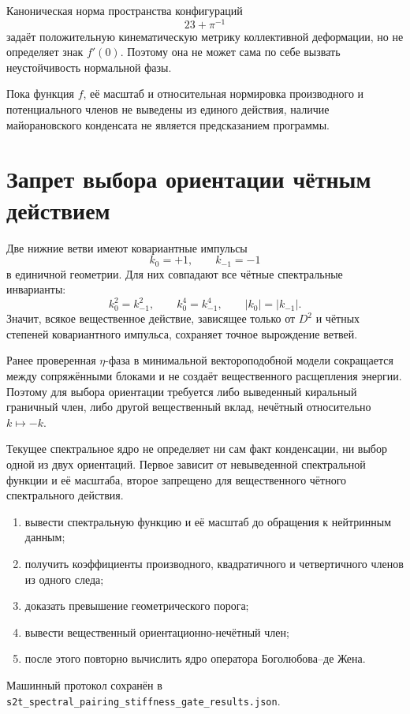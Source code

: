 Каноническая норма пространства конфигураций
\[
 23+\pi^{-1}
\]
задаёт положительную кинематическую метрику коллективной деформации, но не
определяет знак \(f'(0)\). Поэтому она не может сама по себе вызвать
неустойчивость нормальной фазы.

\begin{nogocriterion}
Пока функция \(f\), её масштаб и относительная нормировка производного и
потенциального членов не выведены из единого действия, наличие
майорановского конденсата не является предсказанием программы.
\end{nogocriterion}

\section{Запрет выбора ориентации чётным действием}

Две нижние ветви имеют ковариантные импульсы
\[
 k_{0}=+1,\qquad k_{-1}=-1
\]
в единичной геометрии. Для них совпадают все чётные спектральные
инварианты:
\[
 k_0^2=k_{-1}^2,\qquad
 k_0^4=k_{-1}^4,\qquad
 |k_0|=|k_{-1}|.
\]
Значит, всякое вещественное действие, зависящее только от \(D^2\) и чётных
степеней ковариантного импульса, сохраняет точное вырождение ветвей.

Ранее проверенная \(\eta\)-фаза в минимальной вектороподобной модели
сокращается между сопряжёнными блоками и не создаёт вещественного
расщепления энергии. Поэтому для выбора ориентации требуется либо
выведенный киральный граничный член, либо другой вещественный вклад,
нечётный относительно \(k\mapsto-k\).

\begin{proposition}
Текущее спектральное ядро не определяет ни сам факт конденсации, ни выбор
одной из двух ориентаций. Первое зависит от невыведенной спектральной
функции и её масштаба, второе запрещено для вещественного чётного
спектрального действия.
\end{proposition}

\begin{protocol}
\begin{enumerate}
 \item вывести спектральную функцию и её масштаб до обращения к
 нейтринным данным;
 \item получить коэффициенты производного, квадратичного и четвертичного
 членов из одного следа;
 \item доказать превышение геометрического порога;
 \item вывести вещественный ориентационно-нечётный член;
 \item после этого повторно вычислить ядро оператора Боголюбова--де Жена.
\end{enumerate}
\end{protocol}

Машинный протокол сохранён в
\texttt{s2t\_spectral\_pairing\_stiffness\_gate\_results.json}.